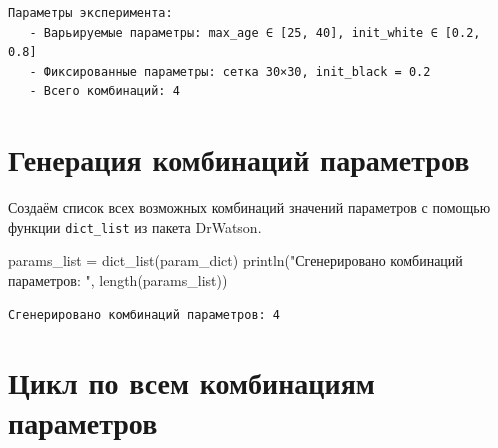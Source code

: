 \documentclass[
  12pt,
  a4paper,
  DIV=11,
  numbers=noendperiod]{scrreprt}
\newenvironment{Shaded}{\begin{snugshade}}{\end{snugshade}}
\newcommand{\FunctionTok}[1]{\textcolor[rgb]{0.28,0.35,0.67}{#1}}
\newcommand{\NormalTok}[1]{\textcolor[rgb]{0.00,0.23,0.31}{#1}}
\newcommand{\OperatorTok}[1]{\textcolor[rgb]{0.37,0.37,0.37}{#1}}
\newcommand{\SpecialCharTok}[1]{\textcolor[rgb]{0.37,0.37,0.37}{#1}}
\newcommand{\StringTok}[1]{\textcolor[rgb]{0.13,0.47,0.30}{#1}}
\begin{document}
\begin{Shaded}
\end{Shaded}

\begin{verbatim}
Параметры эксперимента:
   - Варьируемые параметры: max_age ∈ [25, 40], init_white ∈ [0.2, 0.8]
   - Фиксированные параметры: сетка 30×30, init_black = 0.2
   - Всего комбинаций: 4
\end{verbatim}

\section{Генерация комбинаций
параметров}\label{ux433ux435ux43dux435ux440ux430ux446ux438ux44f-ux43aux43eux43cux431ux438ux43dux430ux446ux438ux439-ux43fux430ux440ux430ux43cux435ux442ux440ux43eux432-1}

Создаём список всех возможных комбинаций значений параметров с помощью
функции \texttt{dict\_list} из пакета DrWatson.

\begin{Shaded}
\begin{Highlighting}[]
\NormalTok{params\_list }\OperatorTok{=} \FunctionTok{dict\_list}\NormalTok{(param\_dict)}
\FunctionTok{println}\NormalTok{(}\StringTok{"Сгенерировано комбинаций параметров: "}\NormalTok{, }\FunctionTok{length}\NormalTok{(params\_list))}
\end{Highlighting}
\end{Shaded}

\begin{verbatim}
Сгенерировано комбинаций параметров: 4
\end{verbatim}

\section{Цикл по всем комбинациям
параметров}\label{ux446ux438ux43aux43b-ux43fux43e-ux432ux441ux435ux43c-ux43aux43eux43cux431ux438ux43dux430ux446ux438ux44fux43c-ux43fux430ux440ux430ux43cux435ux442ux440ux43eux432-1}
\end{document}
